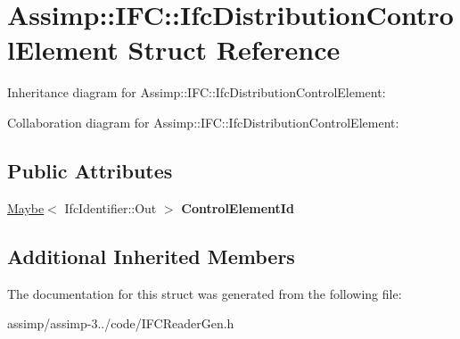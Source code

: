 \hypertarget{struct_assimp_1_1_i_f_c_1_1_ifc_distribution_control_element}{\section{Assimp\+:\+:I\+F\+C\+:\+:Ifc\+Distribution\+Control\+Element Struct Reference}
\label{struct_assimp_1_1_i_f_c_1_1_ifc_distribution_control_element}
}


Inheritance diagram for Assimp\+:\+:I\+F\+C\+:\+:Ifc\+Distribution\+Control\+Element\+:


Collaboration diagram for Assimp\+:\+:I\+F\+C\+:\+:Ifc\+Distribution\+Control\+Element\+:
\subsection*{Public Attributes}
\begin{DoxyCompactItemize}
\item 
\hypertarget{struct_assimp_1_1_i_f_c_1_1_ifc_distribution_control_element_a47607fde4ccafb7a229333270d8d10bb}{\hyperlink{struct_assimp_1_1_s_t_e_p_1_1_maybe}{Maybe}$<$ Ifc\+Identifier\+::\+Out $>$ {\bfseries Control\+Element\+Id}}\label{struct_assimp_1_1_i_f_c_1_1_ifc_distribution_control_element_a47607fde4ccafb7a229333270d8d10bb}

\end{DoxyCompactItemize}
\subsection*{Additional Inherited Members}


The documentation for this struct was generated from the following file\+:\begin{DoxyCompactItemize}
\item 
assimp/assimp-\/3../code/I\+F\+C\+Reader\+Gen.\+h\end{DoxyCompactItemize}
